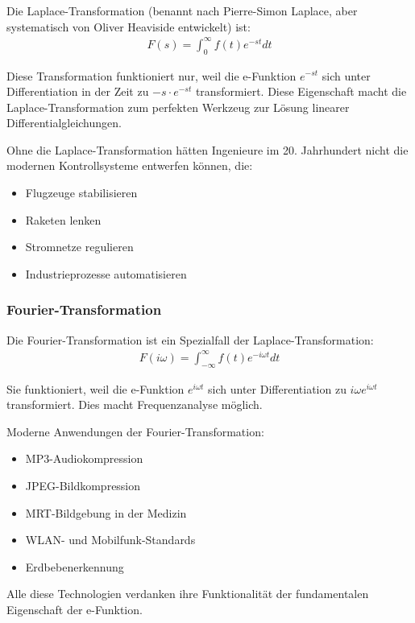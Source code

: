 \documentclass[a4paper,12pt,twoside]{report}
\theoremstyle{definition}
\begin{document}
Die Laplace-Transformation (benannt nach Pierre-Simon Laplace, aber systematisch von Oliver Heaviside entwickelt) ist:
\begin{align}
	F(s) = \int_0^{\infty} f(t) e^{-st} dt
\end{align}

Diese Transformation funktioniert nur, weil die e-Funktion $e^{-st}$ sich unter Differentiation in der Zeit zu $-s \cdot e^{-st}$ transformiert. Diese Eigenschaft macht die Laplace-Transformation zum perfekten Werkzeug zur Lösung linearer Differentialgleichungen.

Ohne die Laplace-Transformation hätten Ingenieure im 20. Jahrhundert nicht die modernen Kontrollsysteme entwerfen können, die:
\begin{itemize}
	\item[-] Flugzeuge stabilisieren
	\item[-] Raketen lenken
	\item[-] Stromnetze regulieren
	\item[-] Industrieprozesse automatisieren
\end{itemize}

\subsubsection*{Fourier-Transformation}

Die Fourier-Transformation ist ein Spezialfall der Laplace-Transformation:
\begin{align}
	F(i\omega) = \int_{-\infty}^{\infty} f(t) e^{-i\omega t} dt
\end{align}

Sie funktioniert, weil die e-Funktion $e^{i\omega t}$ sich unter Differentiation zu $i\omega e^{i\omega t}$ transformiert. Dies macht Frequenzanalyse möglich.

Moderne Anwendungen der Fourier-Transformation:
\begin{itemize}
	\item[-] MP3-Audiokompression
	\item[-] JPEG-Bildkompression
	\item[-] MRT-Bildgebung in der Medizin
	\item[-] WLAN- und Mobilfunk-Standards
	\item[-] Erdbebenerkennung
\end{itemize}

Alle diese Technologien verdanken ihre Funktionalität der fundamentalen Eigenschaft der e-Funktion.
\end{document}
